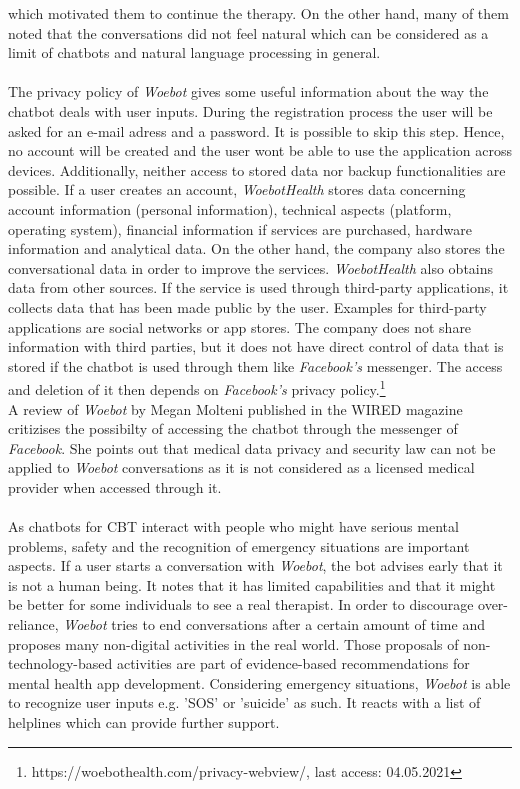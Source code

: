 \documentclass[sigconf, nonacm]{acmart}
\begin{document}
which motivated them to continue the therapy. On the other hand, many of them noted that the conversations did not feel natural which can be considered as a limit of chatbots
and natural language processing in general.\cite{Fitzpatrick2017}
\\\\
The privacy policy of \emph{Woebot} gives some useful information about the way the chatbot deals with user inputs. 
During the registration process the user will be asked for an e-mail adress and a password. It is possible to skip
this step. Hence, no account will be created and the user wont be able to use the application across devices. 
Additionally, neither access to stored data nor backup functionalities are possible. If a user creates an account, \emph{WoebotHealth} stores
data concerning account information (personal information), technical aspects (platform, operating system), financial information if 
services are purchased, hardware information and analytical data. On the other hand, the company also stores the conversational data in order
to improve the services. \emph{WoebotHealth} also obtains data from other sources. If the service is used through third-party applications, 
it collects data that has been made public by the user. Examples for third-party applications are social networks or app stores. 
The company does not share information with third parties, but it does not have direct control of data that is stored if the chatbot
is used through them like \emph{Facebook's} messenger. The access and deletion of it then depends on \emph{Facebook's} privacy policy.\footnote{https://woebothealth.com/privacy-webview/, last access: 04.05.2021}
\\
A review of \emph{Woebot} by Megan Molteni published in the WIRED magazine \cite{Molteni2017} critizises the possibilty of accessing the chatbot through the messenger of \emph{Facebook}.
She points out that medical data privacy and security law can not be applied to \emph{Woebot} conversations as it is not considered as a licensed medical provider when accessed through it.
\\\\
As chatbots for CBT interact with people who might have serious mental problems, safety and the recognition of emergency situations are important
aspects. If a user starts a conversation with \emph{Woebot}, the bot advises early that it is not a human being. It notes that it has limited capabilities and that it might 
be better for some individuals to see a real therapist. In order to discourage over-reliance, \emph{Woebot} tries to end conversations after a certain amount of time and proposes many non-digital activities in the real world.
Those proposals of non-technology-based activities are part of evidence-based recommendations for mental health app development\cite{Bakker2016}.
Considering emergency situations, \emph{Woebot} is able to recognize user inputs e.g. 'SOS' or 'suicide' as such. It reacts with a list of helplines
which can provide further support.\cite{Kretzschmar2019}
\end{document}

